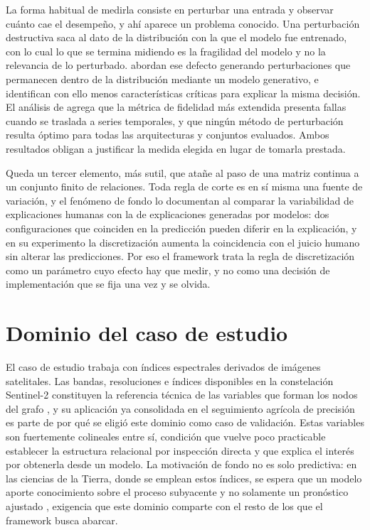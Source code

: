 La forma habitual de medirla consiste en perturbar una entrada y observar cuánto cae el desempeño, y ahí aparece un problema conocido. Una perturbación destructiva saca al dato de la distribución con la que el modelo fue entrenado, con lo cual lo que se termina midiendo es la fragilidad del modelo y no la relevancia de lo perturbado. \textcite{meng2023perturbation} abordan ese defecto generando perturbaciones que permanecen dentro de la distribución mediante un modelo generativo, e identifican con ello menos características críticas para explicar la misma decisión. El análisis de \textcite{simic2025perturbation} agrega que la métrica de fidelidad más extendida presenta fallas cuando se traslada a series temporales, y que ningún método de perturbación resulta óptimo para todas las arquitecturas y conjuntos evaluados. Ambos resultados obligan a justificar la medida elegida en lugar de tomarla prestada.

Queda un tercer elemento, más sutil, que atañe al paso de una matriz continua a un conjunto finito de relaciones. Toda regla de corte es en sí misma una fuente de variación, y el fenómeno de fondo lo documentan \textcite{bogaert2026variability} al comparar la variabilidad de explicaciones humanas con la de explicaciones generadas por modelos: dos configuraciones que coinciden en la predicción pueden diferir en la explicación, y en su experimento la discretización aumenta la coincidencia con el juicio humano sin alterar las predicciones. Por eso el framework trata la regla de discretización como un parámetro cuyo efecto hay que medir, y no como una decisión de implementación que se fija una vez y se olvida.

\section{Dominio del caso de estudio}

El caso de estudio trabaja con índices espectrales derivados de imágenes satelitales. Las bandas, resoluciones e índices disponibles en la constelación Sentinel-2 constituyen la referencia técnica de las variables que forman los nodos del grafo \cite{segarra2020sentinel}, y su aplicación ya consolidada en el seguimiento agrícola de precisión \cite{segarra2020sentinel} es parte de por qué se eligió este dominio como caso de validación. Estas variables son fuertemente colineales entre sí, condición que vuelve poco practicable establecer la estructura relacional por inspección directa y que explica el interés por obtenerla desde un modelo. La motivación de fondo no es solo predictiva: en las ciencias de la Tierra, donde se emplean estos índices, se espera que un modelo aporte conocimiento sobre el proceso subyacente y no solamente un pronóstico ajustado \cite{reichstein2019deep}, exigencia que este dominio comparte con el resto de los que el framework busca abarcar.
